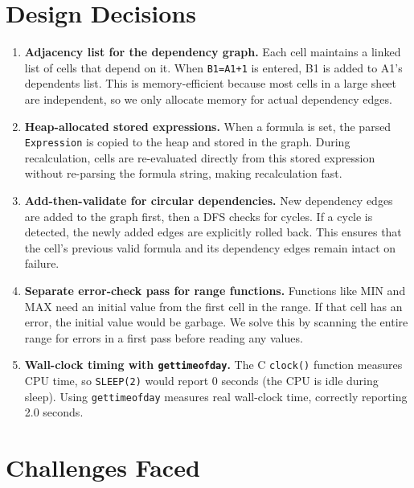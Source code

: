 \documentclass[11pt,a4paper]{article}
\begin{document}
\newpage

\section{Design Decisions}

\begin{enumerate}[leftmargin=*]
    \item \textbf{Adjacency list for the dependency graph.} Each cell maintains a linked list of cells that depend on it. When \texttt{B1=A1+1} is entered, B1 is added to A1's dependents list. This is memory-efficient because most cells in a large sheet are independent, so we only allocate memory for actual dependency edges.

    \item \textbf{Heap-allocated stored expressions.} When a formula is set, the parsed \texttt{Expression} is copied to the heap and stored in the graph. During recalculation, cells are re-evaluated directly from this stored expression without re-parsing the formula string, making recalculation fast.

    \item \textbf{Add-then-validate for circular dependencies.} New dependency edges are added to the graph first, then a DFS checks for cycles. If a cycle is detected, the newly added edges are explicitly rolled back. This ensures that the cell's previous valid formula and its dependency edges remain intact on failure.

    \item \textbf{Separate error-check pass for range functions.} Functions like MIN and MAX need an initial value from the first cell in the range. If that cell has an error, the initial value would be garbage. We solve this by scanning the entire range for errors in a first pass before reading any values.

    \item \textbf{Wall-clock timing with \texttt{gettimeofday}.} The C \texttt{clock()} function measures CPU time, so \texttt{SLEEP(2)} would report 0 seconds (the CPU is idle during sleep). Using \texttt{gettimeofday} measures real wall-clock time, correctly reporting 2.0 seconds.
\end{enumerate}

\section{Challenges Faced}
\end{document}

